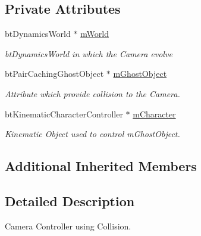 \subsection*{Private Attributes}
\begin{DoxyCompactItemize}
\item 
\mbox{\label{class_collision_1_1_collision_camera_controller_a63cbe384f546c982ea24bbe8918a07d4}} 
bt\+Dynamics\+World $\ast$ \hyperlink{class_collision_1_1_collision_camera_controller_a63cbe384f546c982ea24bbe8918a07d4}{m\+World}
\begin{DoxyCompactList}\small\item\em bt\+Dynamics\+World in which the Camera evolve \end{DoxyCompactList}\item 
\mbox{\label{class_collision_1_1_collision_camera_controller_a6f4788c90fef7434302dec9d78e2e87c}} 
bt\+Pair\+Caching\+Ghost\+Object $\ast$ \hyperlink{class_collision_1_1_collision_camera_controller_a6f4788c90fef7434302dec9d78e2e87c}{m\+Ghost\+Object}
\begin{DoxyCompactList}\small\item\em Attribute which provide collision to the Camera. \end{DoxyCompactList}\item 
\mbox{\label{class_collision_1_1_collision_camera_controller_aeeb0d5cda4e63c73aeda6cf87e5b4b3d}} 
bt\+Kinematic\+Character\+Controller $\ast$ \hyperlink{class_collision_1_1_collision_camera_controller_aeeb0d5cda4e63c73aeda6cf87e5b4b3d}{m\+Character}
\begin{DoxyCompactList}\small\item\em Kinematic Object used to control m\+Ghost\+Object. \end{DoxyCompactList}\end{DoxyCompactItemize}
\subsection*{Additional Inherited Members}


\subsection{Detailed Description}
Camera Controller using Collision. 

